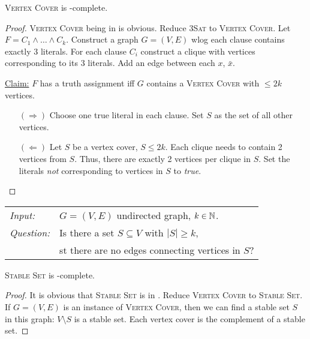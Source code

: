 \documentclass[../skript.tex]{subfiles}
\begin{document}
\begin{theorem} %
\label{thm:8}
\textsc{Vertex Cover} is \NP-complete.
\end{theorem}
\begin{proof}
\textsc{Vertex Cover} being in \NP{} is obvious.
Reduce \textsc{3Sat} to \textsc{Vertex Cover}.
Let $F = C_1 \wedge \ldots \wedge C_k$. Construct a graph $G = (V, E)$
\Ac{wlog} each clause contains exactly 3 literals.
For each clause $C_i$ construct a clique with vertices corresponding to its 3 literals.
Add an edge between each $x$, $\bar{x}$.

\underline{Claim:} $F$ has a truth assignment \ac{iff} $G$ contains a \textsc{Vertex Cover} with $\leq 2k$ vertices.
\begin{itemize}
\item[$(\Rightarrow)$] Choose one true literal in each clause. Set $S$ as the set of all other vertices.
\item[$(\Leftarrow)$] Let $S$ be a vertex cover, $S \leq 2k$. Each clique needs to contain 2 vertices from $S$. Thus, there are exactly 2 vertices per clique in $S$.
Set the literals \emph{not} corresponding to vertices in $S$ to \textit{true}.
\end{itemize}
\end{proof}
\begin{problem}
\begin{tabular}{@{}ll}
\textit{Input:} & $G = (V, E)$ undirected graph, $k \in \mathbb{N}$. \\
\textit{Question:} & Is there a set $S \subseteq V$ with $|S| \geq k$, \\
& \ac{st} there are no edges connecting vertices in $S$?
\end{tabular}
\end{problem}
\begin{theorem} %
\label{thm:9}
\textsc{Stable Set} is \NP-complete.
\end{theorem}
\begin{proof}
It is obvious that \textsc{Stable Set} is in \NP.
Reduce \textsc{Vertex Cover} to \textsc{Stable Set}.
If $G = (V, E)$ is an instance of \textsc{Vertex Cover}, then we can find a stable set $S$ in this graph: $V \setminus S$ is a stable set.
Each vertex cover is the complement of a stable set.
\end{proof}
\end{document}
